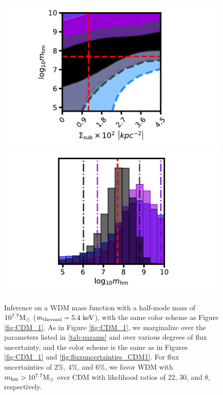 \begin{figure}
	\includegraphics[clip,trim=2cm 0cm 3.5cm
	0.25cm,width=.48\textwidth,keepaspectratio]{./figures_LOSforward/WDM_246_77_joint.pdf}
	\includegraphics[clip,trim=2cm 0cm 3.5cm
	0.5cm,width=.48\textwidth,keepaspectratio]{./figures_LOSforward/WDM_246_77_mhm.pdf}
	\caption{\label{fig:WDM_1} Inference on a WDM mass function with a half-mode mass of $10^{7.7} {\rm{M}_{\odot}}$ ($m_{\rm{thermal}} = 5.4 \ \rm{keV}$), with the same color scheme as Figure \ref{fig:CDM_1}. As in Figure \ref{fig:CDM_1}, we marginalize over the parameters listed in \ref{tab:params} and over various degrees of flux uncertainty, and the color scheme is the same as in Figures \ref{fig:CDM_1} and \ref{fig:fluxuncertainties_CDM1}. For flux uncertainties of $2\%$, $4\%$, and $6\%$, we favor WDM with ${m_{\rm{hm}}} > 10^{7.7} {\rm{M}_{\odot}}$ over CDM with likelihood ratios of 22, 30, and 8, respectively.}
\end{figure}	
